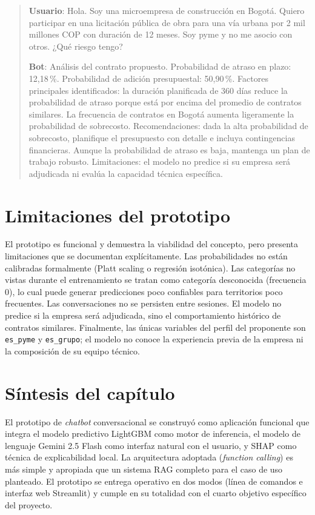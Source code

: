 \documentclass[12pt,letterpaper,oneside]{report}
\begin{document}
\begin{quote}
\textbf{Usuario}: Hola. Soy una microempresa de construcción en Bogotá. Quiero
participar en una licitación pública de obra para una vía urbana por 2 mil
millones COP con duración de 12 meses. Soy pyme y no me asocio con otros.
¿Qué riesgo tengo?

\textbf{Bot}: Análisis del contrato propuesto. Probabilidad de atraso en
plazo: 12,18\,\%. Probabilidad de adición presupuestal: 50,90\,\%. Factores
principales identificados: la duración planificada de 360 días reduce la
probabilidad de atraso porque está por encima del promedio de contratos
similares. La frecuencia de contratos en Bogotá aumenta ligeramente la
probabilidad de sobrecosto. Recomendaciones: dada la alta probabilidad de
sobrecosto, planifique el presupuesto con detalle e incluya contingencias
financieras. Aunque la probabilidad de atraso es baja, mantenga un plan de
trabajo robusto. Limitaciones: el modelo no predice si su empresa será
adjudicada ni evalúa la capacidad técnica específica.
\end{quote}

\section{Limitaciones del prototipo}

El prototipo es funcional y demuestra la viabilidad del concepto, pero
presenta limitaciones que se documentan explícitamente. Las probabilidades no
están calibradas formalmente (Platt scaling o regresión isotónica). Las
categorías no vistas durante el entrenamiento se tratan como categoría
desconocida (frecuencia 0), lo cual puede generar predicciones poco
confiables para territorios poco frecuentes. Las conversaciones no se
persisten entre sesiones. El modelo no predice si la empresa será
adjudicada, sino el comportamiento histórico de contratos similares.
Finalmente, las únicas variables del perfil del proponente son
\texttt{es\_pyme} y \texttt{es\_grupo}; el modelo no conoce la experiencia
previa de la empresa ni la composición de su equipo técnico.

\section{Síntesis del capítulo}

El prototipo de \emph{chatbot} conversacional se construyó como aplicación
funcional que integra el modelo predictivo LightGBM como motor de inferencia,
el modelo de lenguaje Gemini 2.5 Flash como interfaz natural con el usuario,
y SHAP como técnica de explicabilidad local. La arquitectura adoptada
(\emph{function calling}) es más simple y apropiada que un sistema RAG
completo para el caso de uso planteado. El prototipo se entrega operativo en
dos modos (línea de comandos e interfaz web Streamlit) y cumple en su
totalidad con el cuarto objetivo específico del proyecto.
\end{document}
